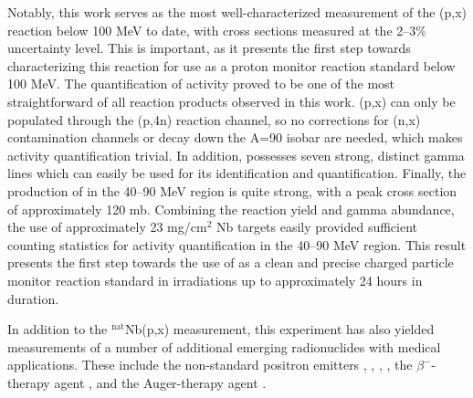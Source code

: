 \documentclass[3p]{elsarticle}
\begin{document}
Notably, this work serves as the most well-characterized measurement of the (p,x) reaction below 100 MeV to date, with cross sections measured  at the 2--3\% uncertainty level.
This is important, as it presents the first step towards characterizing this reaction for use as a proton monitor reaction standard below 100 MeV.
The quantification of  activity proved to be one of the most straightforward of all reaction products observed in this work.
(p,x) can only be populated through the (p,4n) reaction channel, so no corrections for (n,x) contamination channels or decay down the A=90 isobar are needed, which makes activity quantification trivial.
In addition,   possesses seven strong, distinct gamma lines which can easily  be used for its identification and quantification.
Finally, the production of   in the 40--90 MeV region is quite strong, with a peak cross section of approximately 120 mb.
Combining the reaction yield and gamma abundance, the use of approximately 23 mg/cm$^2$ Nb targets easily provided sufficient counting statistics for activity quantification in the 40--90 MeV region.
This result presents the first step towards the use of  as a clean and precise   charged particle monitor reaction standard in irradiations up to approximately 24 hours in duration.





In addition to the $^\text{nat}$Nb(p,x) measurement, this experiment has also yielded measurements of  a number of additional  emerging radionuclides with medical applications.
These include the non-standard positron emitters ,  , ,  , the $\beta^-$-therapy agent  ,  and the Auger-therapy agent . 
\end{document}

